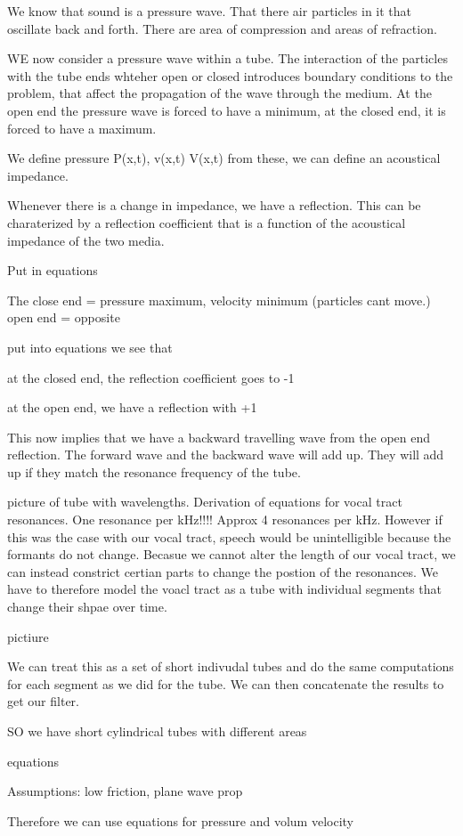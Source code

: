 We know that sound is a pressure wave.  That there air particles in it that oscillate back and forth.  There are area of compression and areas of refraction.  

WE now consider a pressure wave within a tube.  The interaction of the particles with the tube ends whteher open or closed introduces boundary conditions to the problem, that affect the propagation of the wave through the medium.  At the open end the pressure wave is forced to have a minimum, at the closed end, it is forced to have a maximum.

We define pressure P(x,t), v(x,t) V(x,t) from these, we can define an acoustical impedance.

Whenever there is a change in impedance, we have a reflection.  This can be charaterized by a reflection coefficient that is a function of the acoustical impedance of the two media.

Put in equations

The close end = pressure maximum, velocity minimum (particles cant move.)
open end = opposite

put into equations we see that

 at the closed end, the reflection coefficient goes to -1

at the open end, we have a reflection with +1

This now implies that we have a backward travelling wave from the open end reflection.  The forward wave and the backward wave will add up. They will add up if they match the resonance frequency of the tube. 

picture of tube with wavelengths.  Derivation of equations for vocal tract resonances. One resonance per kHz!!!! Approx 4 resonances per kHz. However if this was the case with our vocal tract, speech would be unintelligible because the formants do not change.  Becasue we cannot alter the length of our vocal tract, we can instead constrict certian parts to change the postion of the resonances. We have to therefore model the voacl tract as a tube with individual segments that change their shpae over time.

pictiure

We can treat this as a set of short indivudal tubes and do the same computations for each segment as we did for the tube.  We can then concatenate the results to get our filter.

SO we have short cylindrical tubes with different areas 

equations

Assumptions:
low friction, plane wave prop

Therefore we can use equations for pressure and volum velocity 

